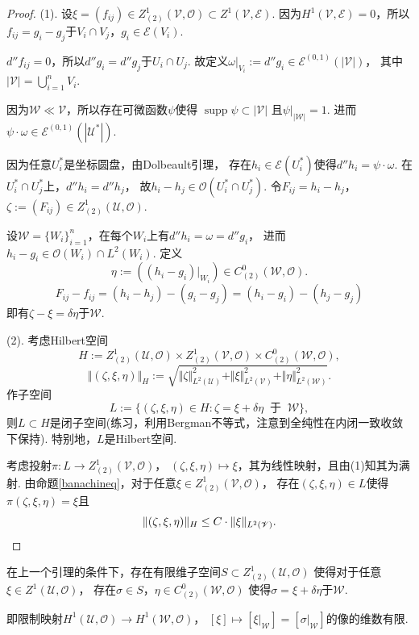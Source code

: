 \begin{proof}
	(1). 设$\xi=(f_{ij})\in Z^1_{(2)}(\mathscr{V},\mathcal{O})\subset Z^1(\mathscr{V}, \mathcal{E})$. 
    因为$H^1(\mathscr{V}, \mathcal{E})=0$，所以$f_{ij}=g_i-g_j$于$V_i\cap V_j$，$g_i\in \mathcal{E}(V_i)$.

	$d''f_{ij}=0$，所以$d''g_i=d''g_j$于$U_i\cap U_j$. 
    故定义$\omega|_{V_i} :=d''g_i\in \mathcal{E}^{(0,1)}(\vert \mathscr{V}\vert)$，
    其中$\vert \mathscr{V}\vert=\bigcup\limits_{i=1}^n V_i$.

	因为$\mathscr{W}\ll\mathscr{V}$，所以存在可微函数$\psi$使得
    $\operatorname{supp}\psi\subset |\mathscr{V}|$
    且$\psi|_{|\mathscr{W}|}=1$. 
    进而$\psi \cdot \omega \in \mathcal{E}^{(0,1)}(|\mathscr{U}^*|)$.

	因为任意$U_i^*$是坐标圆盘，由Dolbeault引理，
    存在$h_i\in \mathcal{E}(U_i^*)$使得$d''h_i=\psi \cdot \omega$.
	在$U_i^*\cap U_j^*$上，$d''h_i=d''h_j$，
    故$h_i-h_j\in \mathcal{O}(U_i^*\cap U_j^*)$. 
    令$F_{ij}=h_i-h_j$，$\zeta:=(F_{ij})\in Z^1_{(2)}(\mathscr{U},\mathcal{O})$.
	
	设$\mathscr{W}=\{W_i\}_{i=1}^n$，在每个$W_i$上有$d''h_i=\omega=d''g_i$，
    进而$h_i-g_i\in \mathcal{O}(W_i)\cap L^2(W_i)$. 定义
	$$\eta:=((h_i-g_i)|_{W_i})\in C^0_{(2)}(\mathscr{W},\mathcal{O}).$$
	$$F_{ij}-f_{ij}=(h_i-h_j)-(g_i-g_j)=(h_i-g_i)-(h_j-g_j)$$
	即有$\zeta-\xi=\delta \eta$于$\mathscr{W}$.
			
	(2). 考虑Hilbert空间
	$$H:=Z^1_{(2)}(\mathscr{U},\mathcal{O})\times Z^1_{(2)}(\mathscr{V},\mathcal{O})\times C^0_{(2)}(\mathscr{W},\mathcal{O}),$$
	$$\Vert (\zeta,\xi,\eta)\Vert_H:=\sqrt{\Vert \zeta\Vert^2_{L^2(\mathscr{U})}+\Vert \xi \Vert^2_{L^2(\mathscr{V})}+\Vert \eta\Vert^2_{L^2(\mathscr{W})}}.$$
	作子空间
	$$L:=\{(\zeta,\xi,\eta)\in H: \zeta=\xi +\delta \eta \ \text{ 于 }\ \mathscr{W}\},$$
	则$L\subset H$是闭子空间(练习，利用Bergman不等式，注意到全纯性在内闭一致收敛下保持). 特别地，$L$是Hilbert空间.
				
	考虑投射$\pi\colon L\rightarrow Z^1_{(2)}(\mathscr{V},\mathcal{O})$，
    $(\zeta,\xi,\eta)\mapsto \xi$，其为线性映射，且由(1)知其为满射. 
    由命题\ref{banachineq}，对于任意$\xi \in Z^1_{(2)}(\mathscr{V},\mathcal{O})$，
    存在$(\zeta,\xi,\eta)\in L$使得$\pi(\zeta,\xi,\eta)=\xi$且
	$$\|(\zeta,\xi,\eta)\|_H\leq C\cdot \|\xi\|_{L^2(\mathscr{V})}.\qedhere$$
\end{proof}

\begin{lemma}
    在上一个引理的条件下，存在有限维子空间$S\subset Z^1_{(2)}(\mathscr{U},\mathcal{O})$
    使得对于任意$\xi \in Z^1(\mathscr{U},\mathcal{O})$，
    存在$\sigma\in S$，$\eta\in C^0_{(2)}(\mathscr{W},\mathcal{O})$
    使得$\sigma=\xi +\delta \eta$于$\mathscr{W}$.

	即限制映射$H^1(\mathscr{U},\mathcal{O})\rightarrow H^1(\mathscr{W},\mathcal{O})$，
    $[\xi]\mapsto [\xi|_{\mathscr{W}}]=[\sigma|_\mathscr{W}]$的像的维数有限.
\end{lemma}
		
